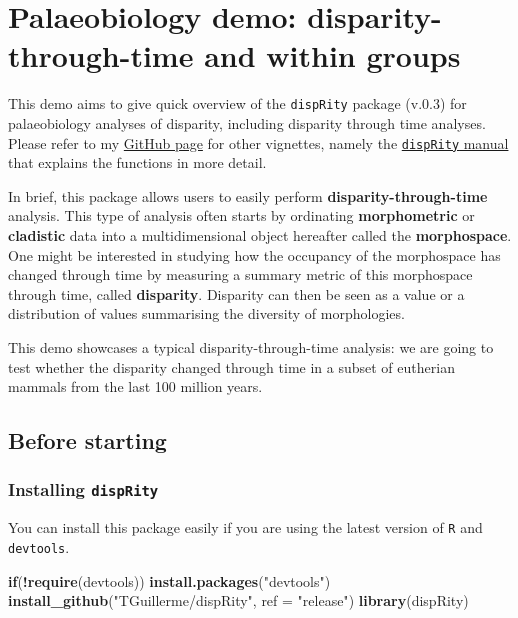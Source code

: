 \documentclass[]{book}
\newenvironment{Shaded}{\begin{snugshade}}{\end{snugshade}}
\newcommand{\KeywordTok}[1]{\textcolor[rgb]{0.13,0.29,0.53}{\textbf{#1}}}
\newcommand{\DataTypeTok}[1]{\textcolor[rgb]{0.13,0.29,0.53}{#1}}
\newcommand{\StringTok}[1]{\textcolor[rgb]{0.31,0.60,0.02}{#1}}
\newcommand{\ControlFlowTok}[1]{\textcolor[rgb]{0.13,0.29,0.53}{\textbf{#1}}}
\newcommand{\OperatorTok}[1]{\textcolor[rgb]{0.81,0.36,0.00}{\textbf{#1}}}
\newcommand{\NormalTok}[1]{#1}
\theoremstyle{definition}
\theoremstyle{definition}
\theoremstyle{remark}
\begin{document}
\chapter{Palaeobiology demo: disparity-through-time and within
groups}\label{palaeobiology-demo-disparity-through-time-and-within-groups}

This demo aims to give quick overview of the \texttt{dispRity} package
(v.0.3) for palaeobiology analyses of disparity, including disparity
through time analyses. Please refer to my
\href{https://github.com/TGuillerme/dispRity}{GitHub page} for other
vignettes, namely the
\href{http://htmlpreview.github.com/?https://github.com/TGuillerme/dispRity/blob/master/doc/dispRity-manual.html}{\texttt{dispRity}
manual} that explains the functions in more detail.

In brief, this package allows users to easily perform
\textbf{disparity-through-time} analysis. This type of analysis often
starts by ordinating \textbf{morphometric} or \textbf{cladistic} data
into a multidimensional object hereafter called the
\textbf{morphospace}. One might be interested in studying how the
occupancy of the morphospace has changed through time by measuring a
summary metric of this morphospace through time, called
\textbf{disparity}. Disparity can then be seen as a value or a
distribution of values summarising the diversity of morphologies.

This demo showcases a typical disparity-through-time analysis: we are
going to test whether the disparity changed through time in a subset of
eutherian mammals from the last 100 million years.

\section{Before starting}\label{before-starting}

\subsection{\texorpdfstring{Installing
\texttt{dispRity}}{Installing dispRity}}\label{installing-disprity}

You can install this package easily if you are using the latest version
of \texttt{R} and \texttt{devtools}.

\begin{Shaded}
\begin{Highlighting}[]
\ControlFlowTok{if}\NormalTok{(}\OperatorTok{!}\KeywordTok{require}\NormalTok{(devtools)) }\KeywordTok{install.packages}\NormalTok{(}\StringTok{"devtools"}\NormalTok{)}
\KeywordTok{install_github}\NormalTok{(}\StringTok{"TGuillerme/dispRity"}\NormalTok{, }\DataTypeTok{ref =} \StringTok{"release"}\NormalTok{)}
\KeywordTok{library}\NormalTok{(dispRity)}
\end{Highlighting}
\end{Shaded}
\end{document}
